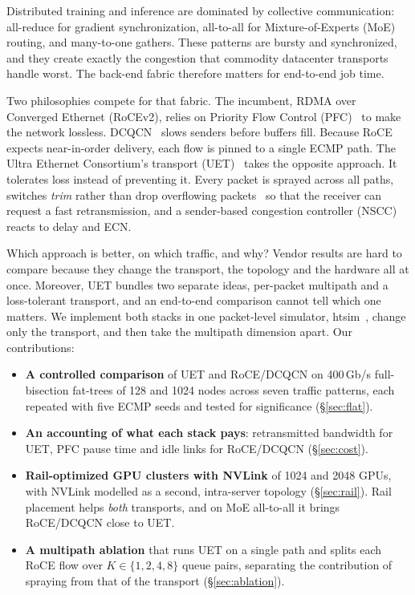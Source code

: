 \documentclass[conference]{IEEEtran}
\begin{document}
Distributed training and inference are dominated by collective communication:
all-reduce for gradient synchronization, all-to-all for Mixture-of-Experts (MoE)
routing, and many-to-one gathers. These patterns are bursty and synchronized,
and they create exactly the congestion that commodity datacenter transports
handle worst. The back-end fabric therefore matters for end-to-end job time.

Two philosophies compete for that fabric. The incumbent, RDMA over Converged
Ethernet (RoCEv2), relies on Priority Flow Control (PFC)~\cite{pfc} to make the
network lossless. DCQCN~\cite{dcqcn} slows senders before buffers fill. Because
RoCE expects near-in-order delivery, each flow is pinned to a single ECMP path.
The Ultra Ethernet Consortium's transport (UET)~\cite{uec-spec,uec-design}
takes the opposite approach. It tolerates loss instead of preventing it. Every
packet is sprayed across all paths, switches \emph{trim} rather than drop
overflowing packets~\cite{ndp} so that the receiver can request a fast
retransmission, and a sender-based congestion controller (NSCC) reacts to delay
and ECN.

Which approach is better, on which traffic, and why? Vendor results are hard to
compare because they change the transport, the topology and the hardware all
at once. Moreover, UET bundles two separate ideas, per-packet multipath and a
loss-tolerant transport, and an end-to-end comparison cannot tell which one
matters. We implement both stacks in one packet-level simulator,
htsim~\cite{ndp}, change only the transport, and then take the multipath
dimension apart. Our contributions:

\begin{itemize}
  \item \textbf{A controlled comparison} of UET and RoCE/DCQCN on 400\,Gb/s
        full-bisection fat-trees of 128 and 1024 nodes across seven traffic
        patterns, each repeated with five ECMP seeds and tested for
        significance (\S\ref{sec:flat}).
  \item \textbf{An accounting of what each stack pays}: retransmitted bandwidth
        for UET, PFC pause time and idle links for RoCE/DCQCN (\S\ref{sec:cost}).
  \item \textbf{Rail-optimized GPU clusters with NVLink} of 1024 and 2048
        GPUs, with NVLink modelled as a second, intra-server topology
        (\S\ref{sec:rail}). Rail placement helps \emph{both} transports, and
        on MoE all-to-all it brings RoCE/DCQCN close to UET.
  \item \textbf{A multipath ablation} that runs UET on a single path and
        splits each RoCE flow over $K\in\{1,2,4,8\}$ queue pairs, separating
        the contribution of spraying from that of the transport
        (\S\ref{sec:ablation}).
\end{itemize}
\end{document}
